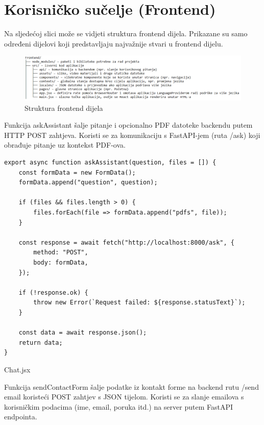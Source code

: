 \documentclass[]{foi}
\begin{document}
\section{Korisničko sučelje (Frontend)}
Na sljedećoj slici može se vidjeti struktura frontend dijela. Prikazane su samo određeni dijelovi koji predstavljaju najvažnije
stvari u frontend dijelu.
\begin{figure}[ht!]
    \centering
    \includegraphics[width=1\textwidth]{./assets/frontendstructure.png} 
    \caption{Struktura frontend dijela}
    \label{fig:slika18}
\end{figure}

Funkcija askAssistant šalje pitanje i opcionalno PDF datoteke backendu putem HTTP POST zahtjeva. Koristi se za komunikaciju s FastAPI-jem
(ruta /ask) koji obrađuje pitanje uz kontekst PDF-ova.

\begin{longlisting}
\begin{verbatim}
export async function askAssistant(question, files = []) {
    const formData = new FormData();
    formData.append("question", question);

    if (files && files.length > 0) {
        files.forEach(file => formData.append("pdfs", file));
    }

    const response = await fetch("http://localhost:8000/ask", {
        method: "POST",
        body: formData,
    });

    if (!response.ok) {
        throw new Error(`Request failed: ${response.statusText}`);
    }

    const data = await response.json();
    return data;
}
\end{verbatim}
\caption{Chat.jsx}
\label{lst:chat}
\end{longlisting}

Funkcija sendContactForm šalje podatke iz kontakt forme na backend rutu /send email koristeći POST zahtjev s JSON tijelom.
Koristi se za slanje emailova s korisničkim podacima (ime, email, poruka itd.) na server putem FastAPI endpointa.
\end{document}
